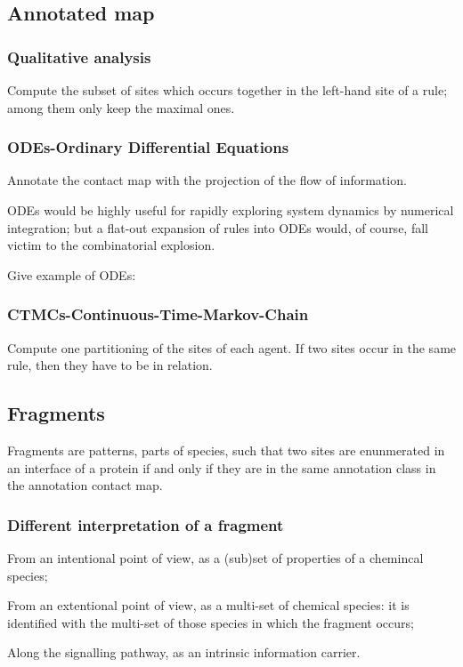\documentclass{article}
\begin{document}
\subsection{Annotated map}


\subsubsection{Qualitative analysis}

Compute the subset of sites which occurs together in the left-hand site of
a rule; among them only keep the maximal ones.


\subsubsection{ODEs-Ordinary Differential Equations}

Annotate the contact map with the projection of the flow of information.

ODEs would be highly useful for rapidly exploring system dynamics by
numerical integration; but a flat-out expansion of rules into ODEs would,
of course, fall victim to the combinatorial explosion.

Give example of ODEs:


\subsubsection{CTMCs-Continuous-Time-Markov-Chain}

Compute one partitioning of the sites of each agent. If two sites occur in
the same rule, then they have to be in relation.

\subsection{Fragments}

Fragments are patterns, parts of species, such that two sites are
enunmerated in an interface of a protein if and only if they are in the
same annotation class in the annotation contact map.

\subsubsection{Different interpretation of a fragment}
\begin{i}
\item From an intentional point of view, as a (sub)set of properties of a
  chemincal species;
\item From an extentional point of view, as a multi-set of chemical
  species: it is identified with the multi-set of those species in which
  the fragment occurs;
\item Along the signalling pathway, as an intrinsic information carrier.
\end{i}
\end{document}
